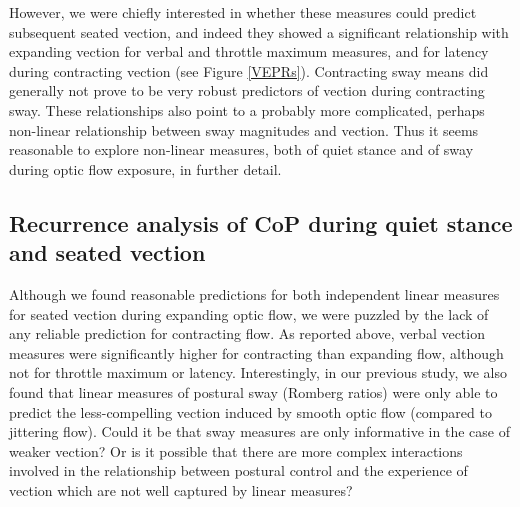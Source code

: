 \documentclass[11pt]{article}
\begin{document}
\begin{linenumbers}
However, we were chiefly interested in whether these measures could predict subsequent seated vection, and indeed they showed a significant relationship with expanding vection for verbal and throttle maximum measures, and for latency during contracting vection (see Figure \ref{VEPRs}). Contracting sway means did generally not prove to be very robust predictors of vection during contracting sway. These relationships also point to a probably more complicated, perhaps non-linear relationship between sway magnitudes and vection. Thus it seems reasonable to explore non-linear measures, both of quiet stance and of sway during optic flow exposure, in further detail. 



\subsection*{Recurrence analysis of CoP during quiet stance and seated vection}
Although we found reasonable predictions for both independent linear measures for seated vection during expanding optic flow, we were puzzled by the lack of any reliable prediction for contracting flow.  As reported above, verbal vection measures were significantly higher for contracting than expanding flow, although not for throttle maximum or latency. Interestingly, in our previous study, we also found that linear measures of postural sway (Romberg ratios) were only able to predict the less-compelling vection induced by smooth optic flow (compared to jittering flow). Could it be that sway measures are only informative in the case of weaker vection? Or is it possible that there are more complex interactions involved in the relationship between postural control and the experience of vection which are not well captured by linear measures? 


\end{linenumbers}
\end{document}
